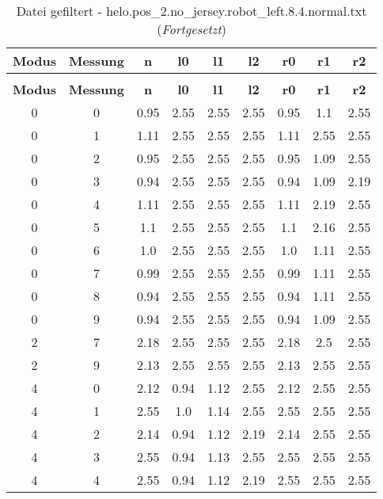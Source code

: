 \begin{longtable}{|c|c||c||c|c|c||c|c|c|}
	\caption{Datei gefiltert - helo.pos\_2.no\_jersey.robot\_left.8.4.normal.txt} \label{tab:helo.pos-2.no-jersey.robot-left.8.4.normal.txt} \\ \hline
	\textbf{Modus} & \textbf{Messung} & \textbf{n} & \textbf{l0} & \textbf{l1} & \textbf{l2} & \textbf{r0} & \textbf{r1} & \textbf{r2}\\ \hline
	\endfirsthead
	\caption[]{Datei gefiltert - helo.pos\_2.no\_jersey.robot\_left.8.4.normal.txt (\emph{Fortgesetzt})} \\ \hline
	\textbf{Modus} & \textbf{Messung} & \textbf{n} & \textbf{l0} & \textbf{l1} & \textbf{l2} & \textbf{r0} & \textbf{r1} & \textbf{r2}\\ \hline
	\endhead
	0 & 0 & 0.95 & 2.55 & 2.55 & 2.55 & 0.95 & 1.1 & 2.55 \\ \hline
	0 & 1 & 1.11 & 2.55 & 2.55 & 2.55 & 1.11 & 2.55 & 2.55 \\ \hline
	0 & 2 & 0.95 & 2.55 & 2.55 & 2.55 & 0.95 & 1.09 & 2.55 \\ \hline
	0 & 3 & 0.94 & 2.55 & 2.55 & 2.55 & 0.94 & 1.09 & 2.19 \\ \hline
	0 & 4 & 1.11 & 2.55 & 2.55 & 2.55 & 1.11 & 2.19 & 2.55 \\ \hline
	0 & 5 & 1.1 & 2.55 & 2.55 & 2.55 & 1.1 & 2.16 & 2.55 \\ \hline
	0 & 6 & 1.0 & 2.55 & 2.55 & 2.55 & 1.0 & 1.11 & 2.55 \\ \hline
	0 & 7 & 0.99 & 2.55 & 2.55 & 2.55 & 0.99 & 1.11 & 2.55 \\ \hline
	0 & 8 & 0.94 & 2.55 & 2.55 & 2.55 & 0.94 & 1.11 & 2.55 \\ \hline
	0 & 9 & 0.94 & 2.55 & 2.55 & 2.55 & 0.94 & 1.09 & 2.55 \\ \hline
	2 & 7 & 2.18 & 2.55 & 2.55 & 2.55 & 2.18 & 2.5 & 2.55 \\ \hline
	2 & 9 & 2.13 & 2.55 & 2.55 & 2.55 & 2.13 & 2.55 & 2.55 \\ \hline
	4 & 0 & 2.12 & 0.94 & 1.12 & 2.55 & 2.12 & 2.55 & 2.55 \\ \hline
	4 & 1 & 2.55 & 1.0 & 1.14 & 2.55 & 2.55 & 2.55 & 2.55 \\ \hline
	4 & 2 & 2.14 & 0.94 & 1.12 & 2.19 & 2.14 & 2.55 & 2.55 \\ \hline
	4 & 3 & 2.55 & 0.94 & 1.13 & 2.55 & 2.55 & 2.55 & 2.55 \\ \hline
	4 & 4 & 2.55 & 0.94 & 1.12 & 2.19 & 2.55 & 2.55 & 2.55 \\ \hline

\end{longtable}
